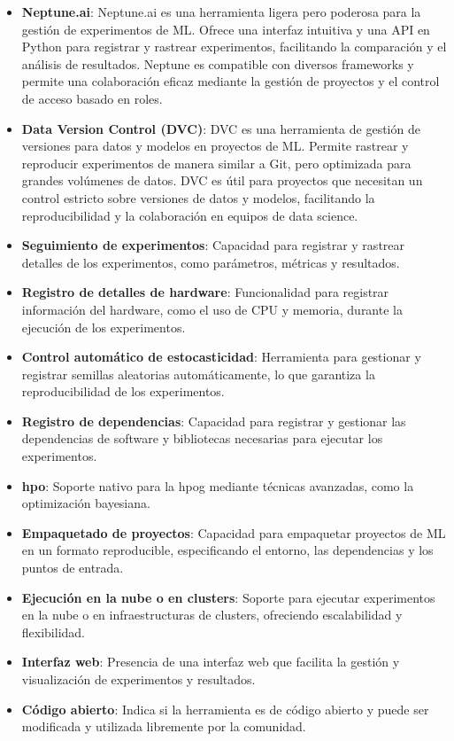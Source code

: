 \begin{itemize}
    \item \textbf{Neptune.ai}: Neptune.ai es una herramienta ligera pero poderosa para la gestión de experimentos de ML. Ofrece una interfaz intuitiva y una API en Python para registrar y rastrear experimentos, facilitando la comparación y el análisis de resultados. Neptune es compatible con diversos frameworks y permite una colaboración eficaz mediante la gestión de proyectos y el control de acceso basado en roles.

    \item \textbf{Data Version Control (DVC)}: DVC es una herramienta de gestión de versiones para datos y modelos en proyectos de ML. Permite rastrear y reproducir experimentos de manera similar a Git, pero optimizada para grandes volúmenes de datos. DVC es útil para proyectos que necesitan un control estricto sobre versiones de datos y modelos, facilitando la reproducibilidad y la colaboración en equipos de data science.
\end{itemize}

\begin{itemize}
    \item \textbf{Seguimiento de experimentos}: Capacidad para registrar y rastrear detalles de los experimentos, como parámetros, métricas y resultados.
    \item \textbf{Registro de detalles de hardware}: Funcionalidad para registrar información del hardware, como el uso de CPU y memoria, durante la ejecución de los experimentos.
    \item \textbf{Control automático de estocasticidad}: Herramienta para gestionar y registrar semillas aleatorias automáticamente, lo que garantiza la reproducibilidad de los experimentos.
    \item \textbf{Registro de dependencias}: Capacidad para registrar y gestionar las dependencias de software y bibliotecas necesarias para ejecutar los experimentos.
    \item \textbf{\acrfull{hpo}}: Soporte nativo para la \gls{hpog} mediante técnicas avanzadas, como la optimización bayesiana.
    \item \textbf{Empaquetado de proyectos}: Capacidad para empaquetar proyectos de ML en un formato reproducible, especificando el entorno, las dependencias y los puntos de entrada.
    \item \textbf{Ejecución en la nube o en clusters}: Soporte para ejecutar experimentos en la nube o en infraestructuras de clusters, ofreciendo escalabilidad y flexibilidad.
    \item \textbf{Interfaz web}: Presencia de una interfaz web que facilita la gestión y visualización de experimentos y resultados.
    \item \textbf{Código abierto}: Indica si la herramienta es de código abierto y puede ser modificada y utilizada libremente por la comunidad.
\end{itemize}


